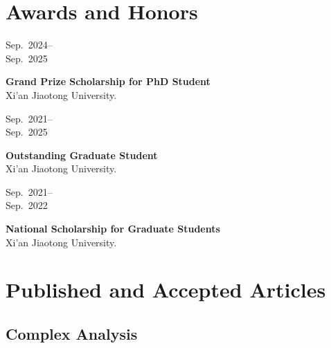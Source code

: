 \documentclass[11pt,letterpaper]{article}
\newcommand{\entry}[3]{\Needspace{3\baselineskip}\noindent\begin{minipage}[t]{1.14in}\vspace{0pt}\small\sffamily\color{muted}\raggedright #2\end{minipage}\hfill\begin{minipage}[t]{\dimexpr\textwidth-1.26in\relax}\vspace{0pt}\raggedright\setlength{\parskip}{0pt}\textbf{#1}\\#3\end{minipage}\par\vspace{3pt}}
\let\originalsection\section
\renewcommand{\section}[1]{\Needspace{7\baselineskip}\originalsection{#1}}
\begin{document}
\section{Awards and Honors}
\entry{Grand Prize Scholarship for PhD Student}{Sep.~2024--\\Sep.~2025}{Xi'an Jiaotong University.}
\entry{Outstanding Graduate Student}{Sep.~2021--\\Sep.~2025}{Xi'an Jiaotong University.}
\entry{National Scholarship for Graduate Students}{Sep.~2021--\\Sep.~2022}{Xi'an Jiaotong University.}

\section{Published and Accepted Articles}

\subsection{Complex Analysis}
\end{document}
